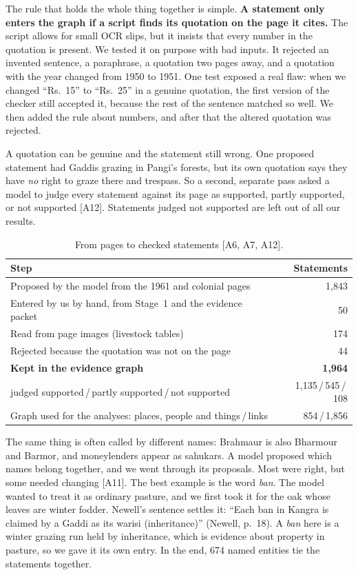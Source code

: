 \documentclass[10pt,a4paper,twocolumn]{article}
\newcommand{\pg}[2]{(#1, p.~#2)}
\newcommand{\entry}[1]{{\small\sffamily\color{muted}[#1]}}
\begin{document}
The rule that holds the whole thing together is simple. \textbf{A statement only enters the graph if a script finds its quotation on the page it cites.} The script allows for small OCR slips, but it insists that every number in the quotation is present. We tested it on purpose with bad inputs. It rejected an invented sentence, a paraphrase, a quotation two pages away, and a quotation with the year changed from 1950 to 1951. One test exposed a real flaw: when we changed ``Rs.~15'' to ``Rs.~25'' in a genuine quotation, the first version of the checker still accepted it, because the rest of the sentence matched so well. We then added the rule about numbers, and after that the altered quotation was rejected.

A quotation can be genuine and the statement still wrong. One proposed statement had Gaddis grazing in Pangi's forests, but its own quotation says they have \emph{no} right to graze there and trespass. So a second, separate pass asked a model to judge every statement against its page as supported, partly supported, or not supported \entry{A12}. Statements judged not supported are left out of all our results.

\begin{table}[!htbp]
\centering\small
\begin{tabularx}{\columnwidth}{@{}>{\raggedright\arraybackslash}Xr@{}}
\toprule
\textbf{Step} & \textbf{Statements}\\
\midrule
Proposed by the model from the 1961 and colonial pages & 1,843\\
Entered by us by hand, from Stage~1 and the evidence packet & 50\\
Read from page images (livestock tables) & 174\\
Rejected because the quotation was not on the page & 44\\
\textbf{Kept in the evidence graph} & \textbf{1,964}\\
\quad judged supported\,/\,partly supported\,/\,not supported & 1,135\,/\,545\,/\,108\\
Graph used for the analyses: places, people and things\,/\,links & 854\,/\,1,856\\
\bottomrule
\end{tabularx}
\caption{From pages to checked statements \entry{A6, A7, A12}.}\label{tab:claims}
\end{table}

The same thing is often called by different names: Brahmaur is also Bharmour and Barmor, and moneylenders appear as sahukars. A model proposed which names belong together, and we went through its proposals. Most were right, but some needed changing \entry{A11}. The best example is the word \emph{ban}. The model wanted to treat it as ordinary pasture, and we first took it for the oak whose leaves are winter fodder. Newell's sentence settles it: ``Each ban in Kangra is claimed by a Gaddi as its warisi (inheritance)'' \pg{Newell}{18}. A \emph{ban} here is a winter grazing run held by inheritance, which is evidence about property in pasture, so we gave it its own entry. In the end, 674 named entities tie the statements together.
\end{document}
